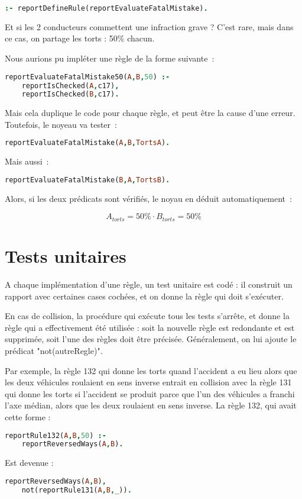 \begin{lstlisting}[language=Prolog,frame=single]
:- reportDefineRule(reportEvaluateFatalMistake).
\end{lstlisting}

Et si les 2 conducteurs commettent une infraction grave ?
C'est rare, mais dans ce cas, on partage les torts : 50\% chacun.

Nous aurions pu impléter une règle de la forme suivante~:

\begin{lstlisting}[language=Prolog,frame=single]
reportEvaluateFatalMistake50(A,B,50) :-
    reportIsChecked(A,c17),
    reportIsChecked(B,c17).
\end{lstlisting}

Mais cela duplique le code pour chaque règle, et peut être la cause d'une erreur. Toutefois, le noyeau va tester~:

\begin{lstlisting}[language=Prolog,frame=single]
reportEvaluateFatalMistake(A,B,TortsA).
\end{lstlisting}

Mais aussi~:

\begin{lstlisting}[language=Prolog,frame=single]
reportEvaluateFatalMistake(B,A,TortsB).
\end{lstlisting}

Alors, si les deux prédicats sont vérifiés, le noyau en déduit automatiquement~:

\[A_{torts} = 50\% \cdot B_{torts} = 50\%\]

\section{Tests unitaires}

A chaque implémentation d'une règle, un test unitaire est codé : il construit un rapport avec certaines cases cochées, et on donne la règle qui doit s'exécuter.

En cas de collision, la procédure qui exécute tous les tests s'arrête, et donne la règle qui a effectivement été utilisée : soit la nouvelle règle est redondante et est supprimée, soit l'une des règles doit être précisée. Généralement, on lui ajoute le prédicat "not(autreRegle)".

Par exemple, la règle 132 qui donne les torts quand l'accident a eu lieu alors que les deux véhicules roulaient en sens inverse entrait en collision avec la règle 131 qui donne les torts si l'accident se produit parce que l'un des véhicules a franchi l'axe médian, alors que les deux roulaient en sens inverse.
La règle 132, qui avait cette forme :

\begin{lstlisting}[language=Prolog,frame=single]
reportRule132(A,B,50) :-
    reportReversedWays(A,B).
\end{lstlisting}

Est devenue :

\begin{lstlisting}[language=Prolog,frame=single]
reportReversedWays(A,B),
    not(reportRule131(A,B,_)).
\end{lstlisting}


